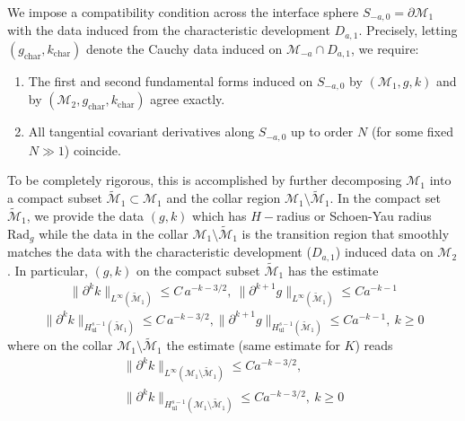 \documentclass{amsart}
\begin{document}
\medskip

\noindent We impose a compatibility condition across the interface sphere $S_{-a,0}=\partial\mathcal M_{1}$ with the data
induced from the characteristic development $D_{a,1}$. Precisely, letting $(g_{\mathrm{char}},k_{\mathrm{char}})$
denote the Cauchy data induced on $\mathcal M_{-a}\cap D_{a,1}$, we require:

\begin{enumerate}
\item The first and second fundamental forms induced on $S_{-a,0}$ by $(\mathcal M_{1},g,k)$ and by
$(\mathcal M_{2},g_{\mathrm{char}},k_{\mathrm{char}})$ agree exactly.
\item All tangential covariant derivatives along $S_{-a,0}$ up to order $N$ (for some fixed $N\gg1$) coincide.
\end{enumerate}
To be completely rigorous, this is accomplished by further decomposing $\mathcal{M}_{1}$ into a compact subset $\widetilde{\mathcal{M}}_{1}\subset \mathcal{M}_{1}$ and the collar region $\mathcal{M}_{1}\setminus \widetilde{\mathcal{M}}_{1}$. In the compact set $\widetilde{\mathcal{M}}_{1}$, we provide the data $(g,k)$ which has $H-$radius or Schoen-Yau radius $\text{Rad}_{g}$ while the data in the collar $\mathcal{M}_{1}\setminus \widetilde{\mathcal{M}}_{1}$ is the transition region that smoothly matches the data with the characteristic development ($D_{a,1}$) induced data on $\mathcal{M}_{2}$. In particular, $(g,k)$ on the compact subset $\widetilde{\mathcal{M}}_{1}$ has the estimate
\begin{align}
\label{eq:first}
\|\partial^{k} k\|_{L^\infty(\widetilde{\mathcal{M}}_{1})}\le C\,a^{-k-3/2},~
\|\partial^{k+1} g\|_{L^\infty(\widetilde{\mathcal{M}}_{1})}\le Ca^{-k-1}\end{align}
\[\|\partial^{k}k\|_{H^{s-1}_{\mathrm{ul}}(\widetilde{\mathcal{M}}_{1})}
\le C\,a^{-k-3/2},
\|\partial^{k+1} g\|_{H^{s-1}_{\mathrm{ul}}(\widetilde{\mathcal{M}}_{1})}
\le Ca^{-k-1},~k\geq 0
\]
where on the collar $\mathcal{M}_{1}\setminus \widetilde{\mathcal{M}}_{1}$ the estimate (same estimate for $K$) reads 
\begin{align}
\label{eq:k1}
\|\partial^{k}k\|_{L^\infty(\mathcal{M}_{1}\setminus \widetilde{\mathcal{M}}_{1})}
\le C a^{-k-3/2},\\
\label{eq:k2}
\|\partial^{k}k\|_{H^{s-1}_{\mathrm{ul}}(\mathcal{M}_{1}\setminus \widetilde{\mathcal{M}}_{1})}
\le C a^{-k-3/2},~k\geq 0
\end{align}
\end{document}
